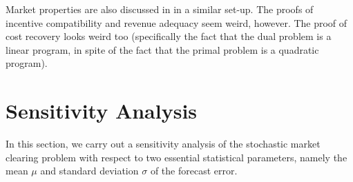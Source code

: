 \documentclass{article}
\begin{document}
Market properties are also discussed in \cite{Ratha2019} in a similar set-up. The proofs of incentive compatibility and revenue adequacy seem weird, however. The proof of cost recovery looks weird too (specifically the fact that the dual problem is a linear program, in spite of the fact that the primal problem is a quadratic program). 

\section{Sensitivity Analysis}

In this section, we carry out a sensitivity analysis of the stochastic market clearing problem with respect to two essential statistical parameters, namely the mean $\mu$ and standard deviation $\sigma$ of the forecast error.
\end{document}
